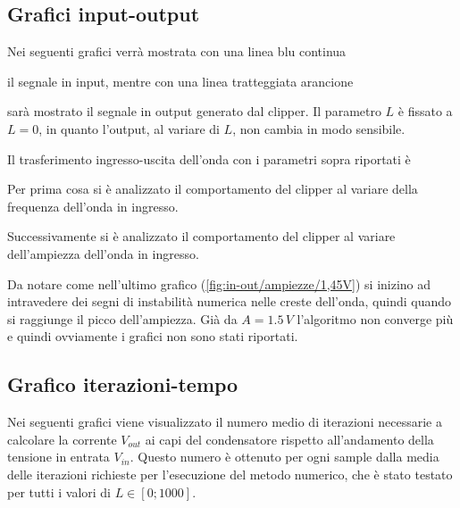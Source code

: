 		\subsection{Grafici input-output}
			\label{graphs:input-output}
			Nei seguenti grafici verrà mostrata con una linea blu continua
			il segnale in \textcolor{matlab_blue}{input}, mentre con una linea tratteggiata arancione
			sarà mostrato il segnale in \textcolor{matlab_orange}{output} generato dal clipper. Il parametro $L$ è fissato a $L = 0$, in quanto l'output, al variare di $L$, non cambia in modo sensibile.
		
			Il trasferimento ingresso-uscita dell'onda con i parametri sopra riportati è
			\pagebreak
		
			Per prima cosa si è analizzato il comportamento del clipper al variare della frequenza dell'onda in ingresso.
			\graficospace
			\graficospace
			\pagebreak
		
			Successivamente si è analizzato il comportamento del clipper al variare dell'ampiezza dell'onda in ingresso.
			\graficospace
			\graficospace
			
			Da notare come nell'ultimo grafico (\ref{fig:in-out/ampiezze/1,45V}) si inizino ad intravedere dei segni di instabilità numerica nelle creste dell'onda, quindi quando si raggiunge il picco dell'ampiezza. Già da $A = 1.5\,V$ l'algoritmo non converge più e quindi ovviamente i grafici non sono stati riportati.
			\pagebreak
		
		\subsection{Grafico iterazioni-tempo}
			\label{graphs:iterazioni-tempo}
			Nei seguenti grafici viene visualizzato il numero medio di iterazioni necessarie a calcolare la corrente $V_{out}$ ai capi del condensatore rispetto all'andamento della tensione in entrata $V_{in}$. Questo numero è ottenuto per ogni sample dalla media delle iterazioni richieste per l'esecuzione del metodo numerico, che è stato testato per tutti i valori di $L \in [0; 1000]$. 

